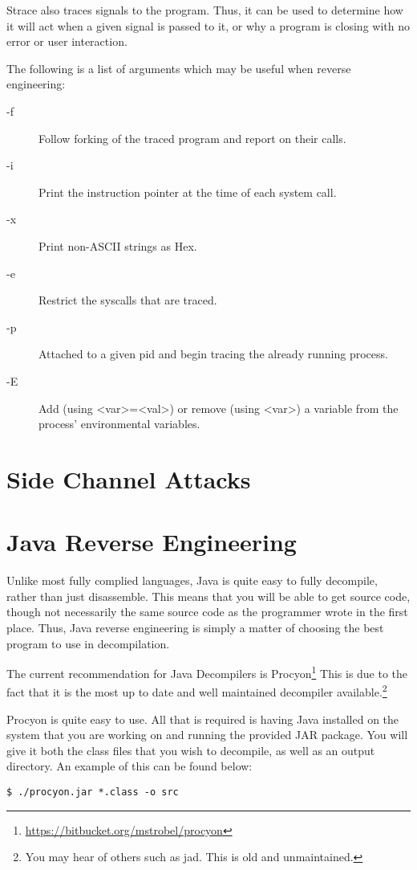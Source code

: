 			Strace also traces signals to the program. 
			Thus, it can be used to determine how it will act when a given signal is passed to it, or why a program is closing with no error or user interaction. 
			
			The following is a list of arguments which may be useful when reverse engineering:
			\begin{description}
				\item[-f] Follow forking of the traced program and report on their calls. 
				\item[-i] Print the instruction pointer at the time of each system call. 
				\item[-x] Print non-ASCII strings as Hex. 
				\item[-e] Restrict the syscalls that are traced.
				\item[-p] Attached to a given pid and begin tracing the already running process. 
				\item[-E] Add (using <var>=<val>) or remove (using <var>) a variable from the process' environmental variables.
			\end{description}
	\section{Side Channel Attacks}
	\section{Java Reverse Engineering}
		Unlike most fully complied languages, Java is quite easy to fully decompile, rather than just disassemble. 
		This means that you will be able to get source code, though not necessarily the same source code as the programmer wrote in the first place. 
		Thus, Java reverse engineering is simply a matter of choosing the best program to use in decompilation. 

		The current recommendation for Java Decompilers is Procyon\footnote{\url{https://bitbucket.org/mstrobel/procyon}}
		This is due to the fact that it is the most up to date and well maintained decompiler available.\footnote{You may hear of others such as jad. This is old and unmaintained.} 
		
		Procyon is quite easy to use. 
		All that is required is having Java installed on the system that you are working on and running the provided JAR package. 
		You will give it both the class files that you wish to decompile, as well as an output directory. 
		An example of this can be found below:
		\begin{lstlisting}[style=CLI]
			$ ./procyon.jar *.class -o src
		\end{lstlisting}

